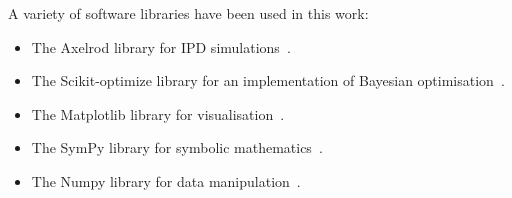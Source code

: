 \documentclass[10pt]{article}
\begin{document}
A variety of software libraries have been used in this work:

\begin{itemize}
    \item The Axelrod library for IPD simulations~\cite{axelrodproject}.
    \item The Scikit-optimize library for an implementation of Bayesian optimisation~\cite{tim_head_2018_1207017}.
    \item The Matplotlib library for visualisation~\cite{hunter2007matplotlib}.
    \item The SymPy library for symbolic mathematics~\cite{sympy}.
    \item The Numpy library for data manipulation~\cite{walt2011numpy}.
\end{itemize}






\appendix

\end{document}
